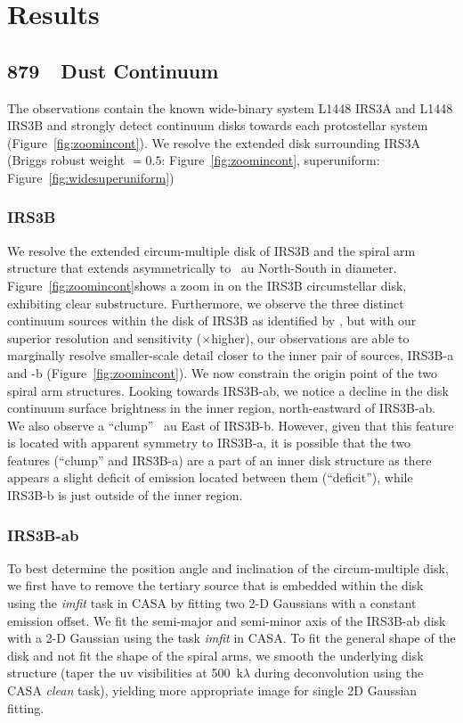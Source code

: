 
\section{Results}\label{sec:results}
\subsection{879~\micron~Dust Continuum}\label{sec:dcont}
The observations contain the known wide-binary system L1448 IRS3A and L1448 IRS3B and strongly detect continuum disks towards each protostellar system (Figure~\ref{fig:zoomincont}). We resolve the extended disk surrounding IRS3A (Briggs robust weight $=0.5$: Figure~\ref{fig:zoomincont}, superuniform: Figure~\ref{fig:widesuperuniform})

\subsubsection{IRS3B}
We resolve the extended circum-multiple disk of IRS3B and the spiral arm structure that extends asymmetrically to ~au North-South  in diameter. Figure~\ref{fig:zoomincont}\space shows a zoom in on the IRS3B circumstellar disk, exhibiting clear substructure. Furthermore, we observe the three distinct continuum sources within the disk of IRS3B as identified by \citet{2016Natur.538..483T}, but with our superior resolution and sensitivity ($\times$\space higher), our observations are able to marginally resolve smaller-scale detail closer to the inner pair of sources, IRS3B-a and -b (Figure~\ref{fig:zoomincont}). We now constrain the origin point of the two spiral arm structures. Looking towards IRS3B-ab, we notice a decline in the disk continuum surface brightness in the inner region, north-eastward of IRS3B-ab. We also observe a ``clump'' ~au East of IRS3B-b. However, given that this feature is located with apparent symmetry to IRS3B-a, it is possible that the two features (``clump'' and IRS3B-a) are a part of an inner disk structure as there appears a slight deficit of emission located between them (``deficit''), while IRS3B-b is just outside of the inner region.

\subsubsection{IRS3B-ab}
To best determine the position angle and inclination of the circum-multiple disk, we first have to remove the tertiary source that is embedded within the disk using the \textit{imfit} task in CASA by fitting two 2-D Gaussians with a constant emission offset.%
We fit the semi-major and semi-minor axis of the IRS3B-ab disk with a 2-D Gaussian using the task \textit{imfit} in CASA. To fit the general shape of the disk and not fit the shape of the spiral arms, we smooth the underlying disk structure (taper the uv visibilities at 500~k$\lambda$ during deconvolution using the CASA \textit{clean} task), yielding more appropriate image for single 2D Gaussian fitting. 

